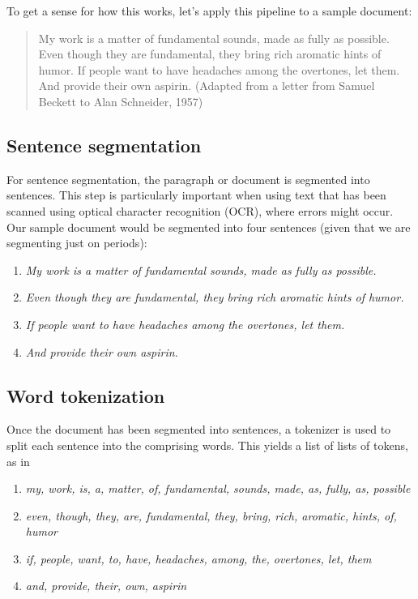 To get a sense for how this works, let's apply this pipeline to a sample document:

\begin{quote}
My work is a matter of fundamental sounds, made as fully as possible. Even though they are fundamental, they bring rich aromatic hints of humor. If people want to have headaches among the overtones, let them. And provide their own aspirin. (Adapted from a letter from Samuel Beckett to Alan Schneider, 1957)
\end{quote}

\subsection{Sentence segmentation} 

For sentence segmentation, the paragraph or document is segmented into sentences. This step is particularly important when using text that has been scanned using optical character recognition (OCR), where errors might occur. Our sample document would be segmented into four sentences (given that we are segmenting just on periods):

\begin{enumerate}
    \item \textit{My work is a matter of fundamental sounds, made as fully as possible.}
    \item \textit{Even though they are fundamental, they bring rich aromatic hints of humor.}
    \item \textit{If people want to have headaches among the overtones, let them.}
    \item \textit{And provide their own aspirin.}
\end{enumerate}

\subsection{Word tokenization} 

Once the document has been segmented into sentences, a tokenizer is used to split each sentence into the comprising words. This yields a list of lists of tokens, as in
\begin{enumerate}
    \item \textit{my, work, is, a, matter, of, fundamental, sounds, made, as, fully, as, possible}
    \item \textit{even, though, they, are, fundamental, they, bring, rich, aromatic, hints, of, humor}
    \item \textit{if, people, want, to, have, headaches, among, the, overtones, let, them}
    \item \textit{and, provide, their, own, aspirin}
\end{enumerate}

